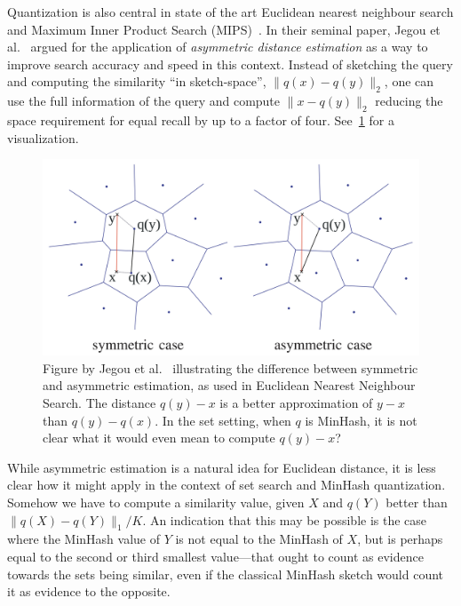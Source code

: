 Quantization is also central in state of the art Euclidean nearest neighbour search and Maximum Inner Product Search (MIPS)~\cite{guo2020accelerating}.
In their seminal paper, Jegou et al.~\cite{jegou2010product}
argued for the application of \emph{asymmetric distance estimation} as a way to improve search accuracy and speed in this context.
Instead of sketching the query and computing the similarity ``in sketch-space'', $\|q(x)-q(y)\|_2$,
one can use the full information of the query and compute $\|x-q(y)\|_2$ reducing the space requirement for equal recall by up to a factor of four.
See~\cref{fig:jegou} for a visualization.

\begin{figure}
   \centering
   \includegraphics[width=\linewidth]{figures/pq}
\caption{Figure by Jegou et al.~\cite{jegou2010product} illustrating the difference between symmetric and asymmetric estimation, as used in Euclidean Nearest Neighbour Search.
   The distance $q(y)-x$ is a better approximation of $y-x$ than $q(y)-q(x)$.
   In the set setting, when $q$ is MinHash, it is not clear what it would even mean to compute $q(y)-x$?
}
   \label{fig:jegou}
\end{figure}


While asymmetric estimation is a natural idea for Euclidean distance, it is less clear how it might apply in the context of set search and MinHash quantization.
Somehow we have to compute a similarity value, given $X$ and $q(Y)$ better than $\|q(X)-q(Y)\|_1/K$.
An indication that this may be possible is the case where the MinHash value of $Y$ is not equal to the MinHash of $X$, but is perhaps equal to the second or third smallest value---that ought to count as evidence towards the sets being similar, even if the classical MinHash sketch would count it as evidence to the opposite.

